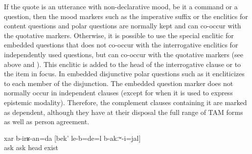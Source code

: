 If the quote is an utterance with non-declarative mood, be it a command or a question, then the mood markers such as the imperative suffix  or the enclitics for content questions  and polar questions  are normally kept and can co-occur with the quotative markers. Otherwise, it is possible to use the special enclitic for embedded questions that does not co-occur with the interrogative enclitics for independently used questions, but can co-occur with the quotative markers (see  above and ). This enclitic is added to the head of the interrogative clause or to the item in focus. In embedded disjunctive polar questions such as  it encliticizes to each member of the disjunction. The embedded question marker does not normally occur in independent clauses (except for when it is used to express epistemic modality). Therefore, the complement clauses containing it are marked as dependent, although they have at their disposal the full range of TAM forms as well as person agreement.
%
\begin{exe}
	\ex	\label{ex:‎‎‎There we will ask if he had a head or not}
	\gll	xar	b-irʁ-an=da	[bek'	le-b=de=l	b-akːʷ-i=jal]\\
		ask	ask	head	exist	\\
	\glt	{}
\end{exe}

